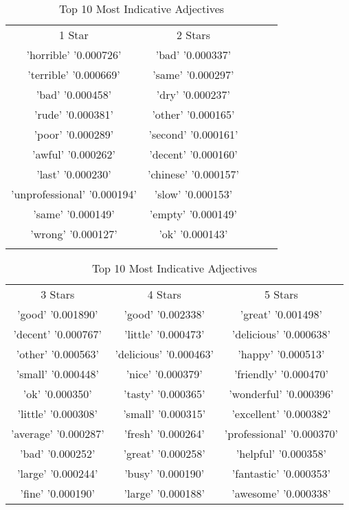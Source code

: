     \begin{center}
        \tiny
        \begin{table}[!h]
        \caption{Top 10 Most Indicative Adjectives}
            \begin{tabular}{c c c c c}
                1 Star & 2 Stars\\
                'horrible' '0.000726' & 'bad' '0.000337'\\
                'terrible' '0.000669' & 'same' '0.000297'\\
                'bad' '0.000458' & 'dry' '0.000237'\\
                'rude' '0.000381' & 'other' '0.000165'\\
                'poor' '0.000289' & 'second' '0.000161'\\
                'awful' '0.000262' & 'decent' '0.000160'\\
                'last' '0.000230' & 'chinese' '0.000157'\\
                'unprofessional' '0.000194' & 'slow' '0.000153'\\
                'same' '0.000149' & 'empty' '0.000149'\\
                'wrong' '0.000127' & 'ok' '0.000143'\\
                \\
            \end{tabular}
            
            \begin{tabular}{c c c}
                3 Stars & 4 Stars & 5 Stars\\
                'good' '0.001890' & 'good' '0.002338' & 'great' '0.001498'\\
                'decent' '0.000767' & 'little' '0.000473' & 'delicious' '0.000638'\\
                'other' '0.000563' & 'delicious' '0.000463' & 'happy' '0.000513'\\
                'small' '0.000448' & 'nice' '0.000379' & 'friendly' '0.000470'\\
                'ok' '0.000350' & 'tasty' '0.000365' & 'wonderful' '0.000396'\\
                'little' '0.000308' & 'small' '0.000315' & 'excellent' '0.000382'\\
                'average' '0.000287' & 'fresh' '0.000264' & 'professional' '0.000370'\\
                'bad' '0.000252' & 'great' '0.000258' & 'helpful' '0.000358'\\
                'large' '0.000244' & 'busy' '0.000190' & 'fantastic' '0.000353'\\
                'fine' '0.000190' & 'large' '0.000188' & 'awesome' '0.000338'\\
            \end{tabular}
        \end{table}
    \end{center}

